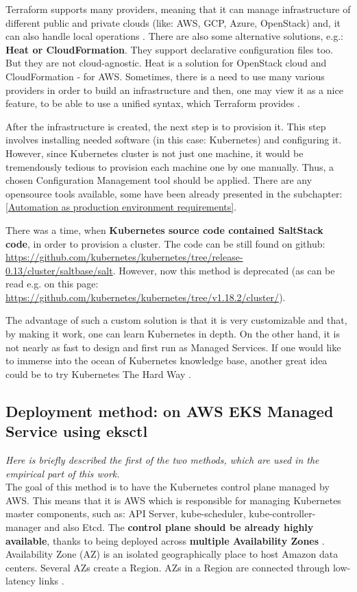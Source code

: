 Terraform supports many providers, meaning that it can manage infrastructure of different public and private clouds (like: AWS, GCP, Azure, OpenStack) and, it can also handle local operations \cite{terraform}. There are also some alternative solutions, e.g.: \textbf{Heat or CloudFormation}. They support declarative configuration files too. But they are not cloud-agnostic. Heat is a solution for OpenStack cloud and CloudFormation - for AWS. Sometimes, there is a need to use many various providers in order to build an infrastructure and then, one may view it as a nice feature, to be able to use a unified syntax, which Terraform provides \cite{terraform-vs}.

After the infrastructure is created, the next step is to provision it. This step involves installing needed software (in this case: Kubernetes) and configuring it. However, since Kubernetes cluster is not just one machine, it would be tremendously tedious to provision each machine one by one manually. Thus, a chosen Configuration Management tool should be applied. There are any opensource tools available, some have been already presented in the subchapter: \ref{Automation as production environment requirements}.

There was a time, when \textbf{Kubernetes source code contained SaltStack code}, in order to provision a cluster. The code can be still found on github: \url{https://github.com/kubernetes/kubernetes/tree/release-0.13/cluster/saltbase/salt}. However, now this method is deprecated (as can be read e.g. on this page: \url{https://github.com/kubernetes/kubernetes/tree/v1.18.2/cluster/}).

The advantage of such a custom solution is that it is very customizable and that, by making it work, one can learn Kubernetes in depth. On the other hand, it is not nearly as fast to design and first run as Managed Services. If one would like to immerse into the ocean of Kubernetes knowledge base, another great idea could be to try Kubernetes The Hard Way \cite{k8s-thw}.


\subsection{Deployment method: on AWS EKS Managed Service using eksctl}
\textit{Here is briefly described the first of the two methods, which are used in the empirical part of this work.}
\\

The goal of this method is to have the Kubernetes control plane managed by AWS. This means that it is AWS which is responsible for managing Kubernetes master components, such as: API Server, kube-scheduler, kube-controller-manager and also Etcd. The \textbf{control plane should be already highly available}, thanks to being deployed across \textbf{multiple Availability Zones} \cite{what-is-eks}. Availability Zone (AZ) is an isolated geographically place to host Amazon data centers. Several AZs create a Region. AZs in a Region are connected through low-latency links \cite{az}.

